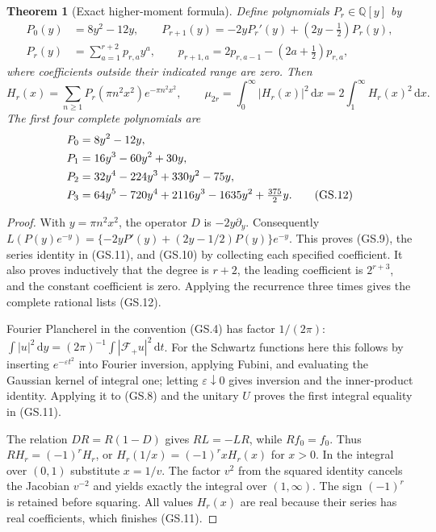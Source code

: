 \documentclass[11pt]{article}
\newtheorem{theorem}{Theorem}
\newcommand{\dd}{\,\mathrm d}
\newcommand{\F}{\mathcal F}
\begin{document}
\begin{theorem}[Exact higher-moment formula]
Define polynomials $P_r\in\mathbb Q[y]$ by
\begin{align}
 P_0(y)&=8y^2-12y,\qquad
 P_{r+1}(y)=-2yP_r'(y)+(2y-\tfrac12)P_r(y),\tag{GS.9}\\
 P_r(y)&=\sum_{a=1}^{r+2}p_{r,a}y^a,\qquad
 p_{r+1,a}=2p_{r,a-1}-(2a+\tfrac12)p_{r,a},\tag{GS.10}
\end{align}
where coefficients outside their indicated range are zero. Then
\begin{equation}
 H_r(x)=\sum_{n\ge1}P_r(\pi n^2x^2)e^{-\pi n^2x^2},\qquad
 \mu_{2r}=\int_0^\infty |H_r(x)|^2\dd x
          =2\int_1^\infty H_r(x)^2\dd x.\tag{GS.11}
\end{equation}
The first four complete polynomials are
\begin{align}
 P_0&=8y^2-12y,\notag\\
 P_1&=16y^3-60y^2+30y,\notag\\
 P_2&=32y^4-224y^3+330y^2-75y,\notag\\
 P_3&=64y^5-720y^4+2116y^3-1635y^2+\tfrac{375}{2}y.
 \tag{GS.12}
\end{align}
\end{theorem}
\begin{proof}
With $y=\pi n^2x^2$, the operator $D$ is $-2y\partial_y$.
Consequently
$L(P(y)e^{-y})=\{-2yP'(y)+(2y-1/2)P(y)\}e^{-y}$.
This proves (GS.9), the series identity in (GS.11), and (GS.10)
by collecting each specified coefficient. It also proves inductively
that the degree is $r+2$, the leading coefficient is $2^{r+3}$,
and the constant coefficient is zero. Applying the recurrence three
times gives the complete rational lists (GS.12).

Fourier Plancherel in the convention (GS.4) has factor $1/(2\pi)$:
$\int|u|^2\dd y=(2\pi)^{-1}\int|\F_+u|^2\dd t$.
For the Schwartz functions here this follows by inserting
$e^{-\varepsilon t^2}$ into Fourier inversion, applying Fubini,
and evaluating the Gaussian kernel of integral one; letting
$\varepsilon\downarrow0$ gives inversion and the inner-product
identity. Applying it to (GS.8) and the unitary $U$ proves the
first integral equality in (GS.11).

The relation $DR=R(1-D)$ gives $RL=-LR$, while $Rf_0=f_0$.
Thus $RH_r=(-1)^rH_r$, or
$H_r(1/x)=(-1)^r xH_r(x)$ for $x>0$. In the integral over
$(0,1)$ substitute $x=1/v$. The factor $v^2$ from the squared
identity cancels the Jacobian $v^{-2}$ and yields exactly the
integral over $(1,\infty)$. The sign $(-1)^r$ is retained before
squaring. All values $H_r(x)$ are real because their series has
real coefficients, which finishes (GS.11).
\end{proof}
\end{document}
